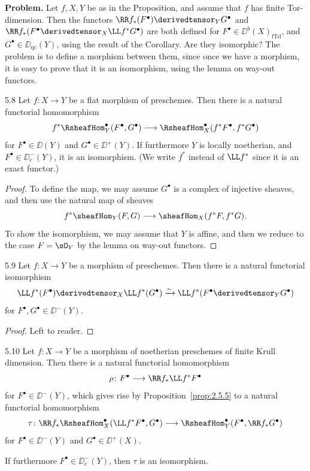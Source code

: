 \textbf{Problem.}
Let $f,X,Y$ be as in the Proposition, and assume that $f$ has finite Tor-dimension. Then the functors $\RR f_*(F^\bullet)\derivedtensor_Y G^\bullet$ and $\RR f_*(F^\bullet\derivedtensor_X \LL f^* G^\bullet)$ are both defined for $F^\bullet\in\DD^b(X)_{\mathrm{fTd}}$, and $G^\bullet\in\DD_{\mathrm{qc}}(Y)$, using the result of the Corollary. Are they isomorphic? The problem is to define a morphism between them, since once we have a morphism, it is easy to prove that it is an isomorphism, using the lemma on way-out functors.

\begin{bookproposition}{5.8}\label{prop:2.5.8}
Let $f\colon X\to Y$ be a flat morphism of preschemes. Then there is a natural functorial homomorphism
\[
f^* \RsheafHom^\bullet_Y(F^\bullet,G^\bullet) \longrightarrow \RsheafHom^\bullet_X(f^*F^\bullet,f^*G^\bullet)
\]
for $F^\bullet\in\DD(Y)$ and $G^\bullet\in\DD^+(Y)$. If furthermore $Y$ is locally noetherian, and $F^\bullet\in\DD_{\mathrm{c}}^-(Y)$, it is an isomorphism. (We write $f^*$ instead of $\LL f^*$ since it is an exact functor.)
\end{bookproposition}

\begin{proof}
To define the map, we may assume $G^\bullet$ is a complex of injective sheaves, and then use the natural map of sheaves
\[
f^*\sheafHom_Y(F,G) \longrightarrow \sheafHom_X(f^*F,f^*G).
\]
To show the isomorphism, we may assume that $Y$ is affine, and then we reduce to the case $F=\sO_Y$ by the lemma on way-out functors.
\end{proof}

\begin{bookproposition}{5.9}\label{prop:2.5.9}
Let $f\colon X\to Y$ be a morphism of preschemes. Then there is a natural functorial isomorphism
\[
\LL f^*(F^\bullet) \derivedtensor_X \LL f^*(G^\bullet) \xrightarrow{\sim} \LL f^*(F^\bullet\derivedtensor_Y G^\bullet)
\]
for $F^\bullet,G^\bullet\in\DD^-(Y)$.
\end{bookproposition}

\begin{proof}
Left to reader.
\end{proof}

\begin{bookproposition}{5.10}\label{prop:2.5.10}
Let $f\colon X\to Y$ be a morphism of noetherian preschemes of finite Krull dimension. Then there is a natural functorial homomorphism
\[
\rho\colon F^\bullet \longrightarrow \RR f_* \LL f^*F^\bullet
\]
for $F^\bullet\in\DD^-(Y)$, which gives rise by Proposition~\ref{prop:2.5.5} to a natural functorial homomorphism
\[
\tau \colon \RR f_* \RsheafHom_X^\bullet(\LL f^* F^\bullet, G^\bullet) \longrightarrow \RsheafHom_Y^\bullet(F^\bullet, \RR f_* G^\bullet)
\]
for $F^\bullet\in\DD^-(Y)$ and $G^\bullet\in\DD^+(X)$.

If furthermore $F^\bullet\in\DD_{\mathrm{c}}^-(Y)$, then $\tau$ is an isomorphism.
\end{bookproposition}

